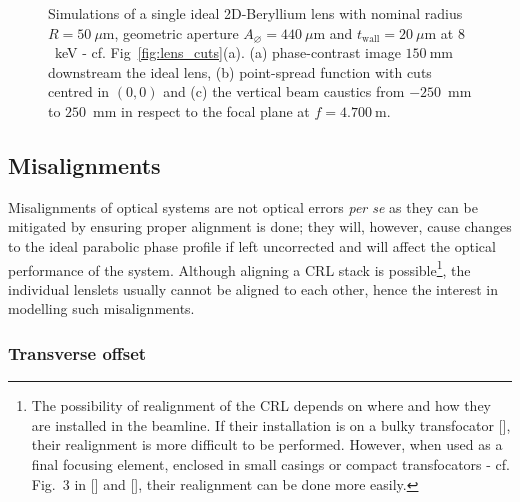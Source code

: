 \begin{refsection}
\begin{figure}[t]
        \caption[The ideal single X-ray lens]{Simulations of a single ideal 2D-Beryllium lens with nominal radius $R=50~\mu\text{m}$, geometric aperture $A_{\diameter}=440~\mu\text{m}$ and $t_\text{wall}=20~\mu$m at $8$~keV  - cf. Fig~\ref{fig:lens_cuts}(a). (a) phase-contrast image $150~$mm downstream the ideal lens, (b) point-spread function with cuts centred in $(0,0)$ and (c) the vertical beam caustics from $-250$~mm to $250$~mm in respect to the focal plane at $f=4.700~$m.} \label{fig:ideal_CRL}
\end{figure}


\subsection{Misalignments}\label{sec:misalignments}

Misalignments of optical systems are not optical errors \textit{per se} as they can be mitigated by ensuring proper alignment is done; they will, however, cause changes to the ideal parabolic phase profile if left uncorrected and will affect the optical performance of the system. Although aligning a CRL stack is possible\footnote{The possibility of realignment of the CRL depends on where and how they are installed in the beamline. If their installation is on a bulky transfocator [\cite{Vaughan2011}], their realignment is more difficult to be performed. However, when used as a final focusing element, enclosed in small casings or compact transfocators - cf. Fig.~3 in [\cite{Lengeler1999}] and [\cite{Kornemann2017, Narikovich2019}], their realignment can be done more easily.}, the individual lenslets usually cannot be aligned to each other, hence the interest in modelling such misalignments.

\subsubsection*{Transverse offset}


\end{refsection}

